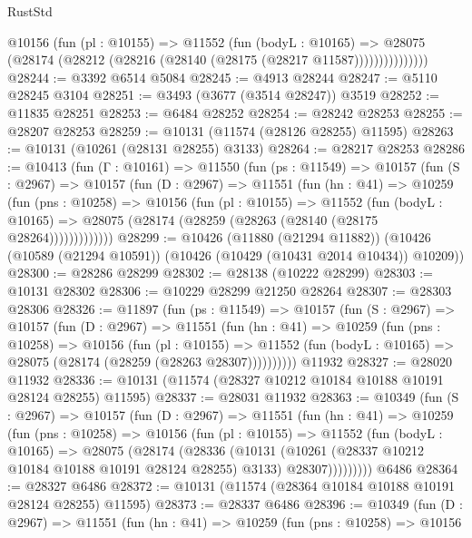 \begin{lexlean}{RustStd}
\begin{coremodule}
                @10156
                  (fun (pl : @10155) =>
                  @11552
                    (fun (bodyL : @10165) =>
                    @28075 (@28174 (@28212 (@28216 (@28140 (@28175 (@28217 @11587)))))))))))))))
@28244 := @3392 @6514 @5084
@28245 := @4913 @28244
@28247 := @5110 @28245 @3104
@28251 := @3493 (@3677 (@3514 @28247)) @3519
@28252 := @11835 @28251
@28253 := @6484 @28252
@28254 := @28242 @28253
@28255 := @28207 @28253
@28259 := @10131 (@11574 (@28126 @28255) @11595)
@28263 := @10131 (@10261 (@28131 @28255) @3133)
@28264 := @28217 @28253
@28286 := @10413
    (fun (Γ : @10161) =>
    @11550
      (fun (ps : @11549) =>
      @10157
        (fun (S : @2967) =>
        @10157
          (fun (D : @2967) =>
          @11551
            (fun (hn : @41) =>
            @10259
              (fun (pns : @10258) =>
              @10156
                (fun (pl : @10155) =>
                @11552
                  (fun (bodyL : @10165) =>
                  @28075 (@28174 (@28259 (@28263 (@28140 (@28175 @28264)))))))))))))
@28299 := @10426
    (@11880 (@21294 @11882))
    (@10426 (@10589 (@21294 @10591)) (@10426 (@10429 (@10431 @2014 @10434)) @10209))
@28300 := @28286 @28299
@28302 := @28138 (@10222 @28299)
@28303 := @10131 @28302
@28306 := @10229 @28299 @21250 @28264
@28307 := @28303 @28306
@28326 := @11897
    (fun (ps : @11549) =>
    @10157
      (fun (S : @2967) =>
      @10157
        (fun (D : @2967) =>
        @11551
          (fun (hn : @41) =>
          @10259
            (fun (pns : @10258) =>
            @10156
              (fun (pl : @10155) =>
              @11552 (fun (bodyL : @10165) => @28075 (@28174 (@28259 (@28263 @28307))))))))))
    @11932
@28327 := @28020 @11932
@28336 := @10131 (@11574 (@28327 @10212 @10184 @10188 @10191 @28124 @28255) @11595)
@28337 := @28031 @11932
@28363 := @10349
    (fun (S : @2967) =>
    @10157
      (fun (D : @2967) =>
      @11551
        (fun (hn : @41) =>
        @10259
          (fun (pns : @10258) =>
          @10156
            (fun (pl : @10155) =>
            @11552
              (fun (bodyL : @10165) =>
              @28075
                (@28174
                  (@28336
                    (@10131
                      (@10261 (@28337 @10212 @10184 @10188 @10191 @28124 @28255) @3133)
                      @28307)))))))))
    @6486
@28364 := @28327 @6486
@28372 := @10131 (@11574 (@28364 @10184 @10188 @10191 @28124 @28255) @11595)
@28373 := @28337 @6486
@28396 := @10349
    (fun (D : @2967) =>
    @11551
      (fun (hn : @41) =>
      @10259
        (fun (pns : @10258) =>
        @10156

\end{coremodule}
\end{lexlean}
